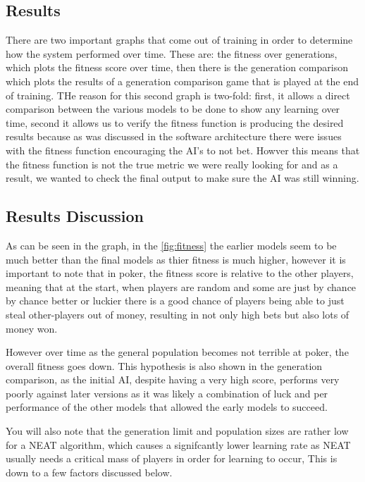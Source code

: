 \subsection{Results}
There are two important graphs that come out of training in order to determine how the system performed over
time. These are: the fitness over generations, which plots the fitness score over time, then there is the
generation comparison which plots the results of a generation comparison game that is played at the end of
training. THe reason for this second graph is two-fold: first, it allows a direct comparison between the various
models to be done to show any learning over time, second it allows us to verify the fitness function is
producing the desired results because as was discussed in the software architecture there were issues with the
fitness function encouraging the AI's to not bet. Howver this means that the fitness function is not the true
metric we were really looking for and as a result, we wanted to check the final output to make sure the AI was
still winning.



\subsection{Results Discussion}
As can be seen in the graph, in the \autoref{fig:fitness} the earlier models seem to be much better than the
final models as thier fitness is much higher, however it is important to note that in poker, the fitness
score is relative to the other players, meaning that at the start, when players are random and some are just by
chance by chance better or luckier there is a good chance of players being able to just steal other-players out
of money, resulting in not only high bets but also lots of money won.

However over time as the general population becomes not terrible at poker, the overall fitness goes down. This
hypothesis is also shown in the generation comparison, as the initial AI, despite having a very high score,
performs very poorly against later versions as it was likely a combination of luck and per performance of the
other models that allowed the early models to succeed.

You will also note that the generation limit and population sizes are rather low for a NEAT algorithm, which
causes a signifcantly lower learning rate as NEAT usually needs a critical mass of players in order for learning
to occur, This is down to a few factors discussed below.

